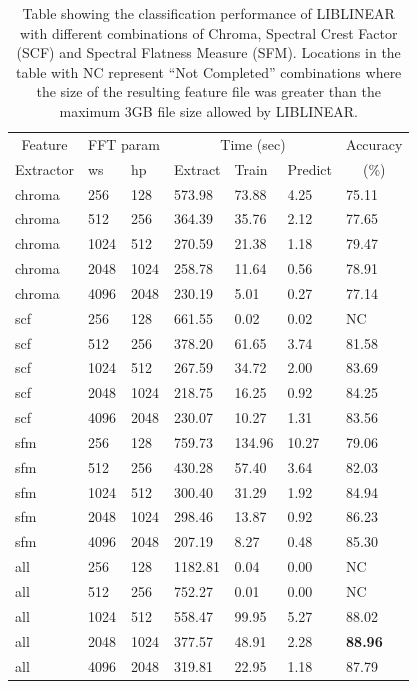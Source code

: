 \documentclass[12pt,oneside]{book}
\begin{document}
\begin{table}
\begin{tabular}{|l|l|l|l|l|l|l|}
\hline
\multicolumn{1}{|c|}{Feature} &\multicolumn{2}{c|}{FFT param} & \multicolumn{3}{c|}{Time (sec)} & Accuracy \\
\hhline{|~|-|-|-|-|-|~|}
Extractor & ws & hp & Extract & Train & Predict & \multicolumn{1}{c|}{(\%)} \\
\hhline{|=|=|=|=|=|=|=|}
chroma & 256 & 128    &   573.98  &   73.88  &   4.25  &  75.11  \\
chroma & 512 & 256    &   364.39  &   35.76  &   2.12  &  77.65  \\
chroma & 1024 & 512   &   270.59  &   21.38  &   1.18  &  79.47  \\
chroma & 2048 & 1024  &   258.78  &   11.64  &   0.56  &  78.91  \\
chroma & 4096 & 2048  &   230.19  &    5.01  &   0.27  &  77.14  \\
scf & 256 & 128       &   661.55  &    0.02  &   0.02  &  NC  \\
scf & 512 & 256       &   378.20  &   61.65  &   3.74  &  81.58  \\
scf & 1024 & 512      &   267.59  &   34.72  &   2.00  &  83.69  \\
scf & 2048 & 1024     &   218.75  &   16.25  &   0.92  &  84.25  \\
scf & 4096 & 2048     &   230.07  &   10.27  &   1.31  &  83.56  \\
\hline
sfm & 256 & 128       &   759.73  &  134.96  &  10.27  &  79.06  \\
sfm & 512 & 256       &   430.28  &   57.40  &   3.64  &  82.03  \\
sfm & 1024 & 512      &   300.40  &   31.29  &   1.92  &  84.94  \\
sfm & 2048 & 1024     &   298.46  &   13.87  &   0.92  &  86.23  \\
sfm & 4096 & 2048     &   207.19  &    8.27  &   0.48  &  85.30  \\
all & 256 & 128       &  1182.81  &    0.04  &   0.00  &  NC  \\
all & 512 & 256       &   752.27  &    0.01  &   0.00  &  NC  \\
all & 1024 & 512      &   558.47  &   99.95  &   5.27  &  88.02  \\
all & 2048 & 1024     &   377.57  &   48.91  &   2.28  &  \textbf{88.96}  \\
all & 4096 & 2048     &   319.81  &   22.95  &   1.18  &  87.79  \\
\hline
\end{tabular}
\caption{Table showing the classification performance of LIBLINEAR
  with different combinations of Chroma, Spectral Crest Factor (SCF)
  and Spectral Flatness Measure (SFM).  Locations in the table with NC
  represent ``Not Completed'' combinations where the size of the
  resulting feature file was greater than the maximum 3GB file size
  allowed by LIBLINEAR.}
\label{table:obv-different-chroma}
\end{table}
\end{document}
